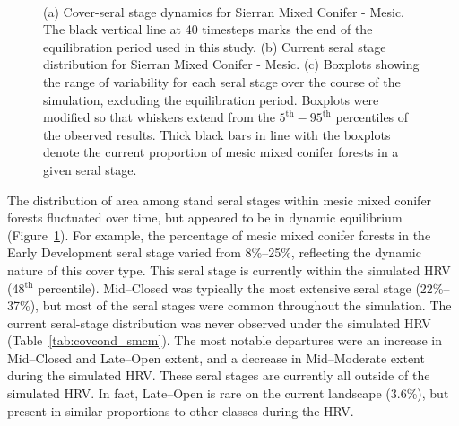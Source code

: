 \begin{figure}[!htbp]
  \centering
   \\
  \caption{(a) Cover-seral stage dynamics for Sierran Mixed Conifer - Mesic. The black vertical line at 40 timesteps marks the end of the equilibration period used in this study. (b) Current seral stage distribution for Sierran Mixed Conifer - Mesic. (c) Boxplots showing the range of variability for each seral stage over the course of the simulation, excluding the equilibration period. Boxplots were modified so that whiskers extend from the $5^{\text{th}} - 95^{\text{th}}$ percentiles of the observed results. Thick black bars in line with the boxplots denote the current proportion of mesic mixed conifer forests in a given seral stage.} 
  \label{fig:hrv-covcond_smcm}
\end{figure}

The distribution of area among stand seral stages within mesic mixed conifer forests fluctuated over time, but appeared to be in dynamic equilibrium (Figure~\ref{fig:hrv-covcond_smcm}). For example, the percentage of mesic mixed conifer forests in the Early Development seral stage varied from 8\%--25\%, reflecting the dynamic nature of this cover type. This seral stage is currently within the simulated HRV (48$^{\text{th}}$ percentile). Mid--Closed was typically the most extensive seral stage (22\%--37\%), but most of the seral stages were common throughout the simulation. %
The current seral-stage distribution was never observed under the simulated HRV (Table~\ref{tab:covcond_smcm}). The most notable departures were an increase in Mid--Closed and Late--Open extent, and a decrease in Mid--Moderate extent during the simulated HRV. These seral stages are currently all outside of the simulated HRV. In fact, Late--Open is rare on the current landscape (3.6\%), but present in similar proportions to  other classes during the HRV. 



